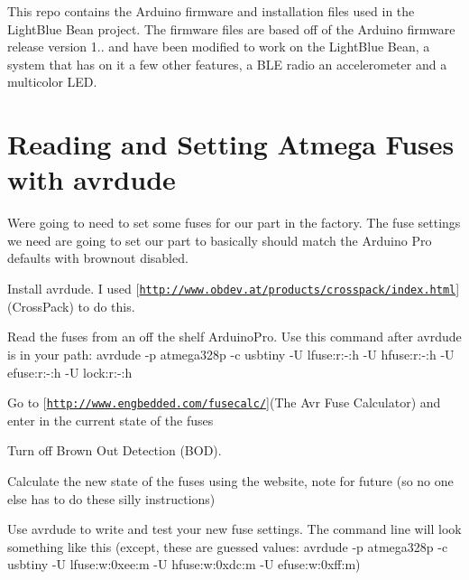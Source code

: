 This repo contains the Arduino firmware and installation files used in the Light\+Blue Bean project. The firmware files are based off of the Arduino firmware release version 1.. and have been modified to work on the Light\+Blue Bean, a system that has on it a few other features, a B\+L\+E radio an accelerometer and a multicolor L\+E\+D.

\section*{Reading and Setting Atmega Fuses with avrdude}

We\textquotesingle{}re going to need to set some fuses for our part in the factory. The fuse settings we need are going to set our part to basically should match the Arduino Pro defaults with brownout disabled.


\begin{DoxyEnumerate}
\item Install avrdude. I used \mbox{[}\href{http://www.obdev.at/products/crosspack/index.html}{\tt http\+://www.\+obdev.\+at/products/crosspack/index.\+html}\mbox{]}(Cross\+Pack) to do this.
\end{DoxyEnumerate}
\begin{DoxyEnumerate}
\item Read the fuses from an off the shelf Arduino\+Pro. Use this command after avrdude is in your path\+: {\ttfamily avrdude -\/p atmega328p -\/c usbtiny -\/\+U lfuse\+:r\+:-\/\+:h -\/\+U hfuse\+:r\+:-\/\+:h -\/\+U efuse\+:r\+:-\/\+:h -\/\+U lock\+:r\+:-\/\+:h}
\end{DoxyEnumerate}
\begin{DoxyEnumerate}
\item Go to \mbox{[}\href{http://www.engbedded.com/fusecalc/}{\tt http\+://www.\+engbedded.\+com/fusecalc/}\mbox{]}(The Avr Fuse Calculator) and enter in the current state of the fuses
\end{DoxyEnumerate}
\begin{DoxyEnumerate}
\item Turn off Brown Out Detection (B\+O\+D).
\end{DoxyEnumerate}
\begin{DoxyEnumerate}
\item Calculate the new state of the fuses using the website, note for future (so no one else has to do these silly instructions)
\end{DoxyEnumerate}
\begin{DoxyEnumerate}
\item Use avrdude to write and test your new fuse settings. The command line will look something like this (except, these are guessed values\+: {\ttfamily avrdude -\/p atmega328p -\/c usbtiny -\/\+U lfuse\+:w\+:0xee\+:m -\/\+U hfuse\+:w\+:0xdc\+:m -\/\+U efuse\+:w\+:0xff\+:m})
\end{DoxyEnumerate}

